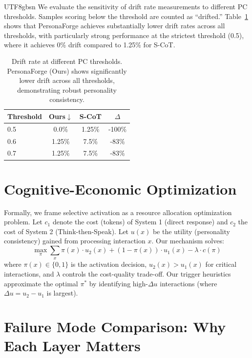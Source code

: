 \documentclass[11pt]{article}
\begin{document}
\begin{CJK*}{UTF8}{gbsn}
We evaluate the sensitivity of drift rate measurements to different PC thresholds. Samples scoring below the threshold are counted as ``drifted.'' Table~\ref{tab:threshold} shows that PersonaForge achieves substantially lower drift rates across all thresholds, with particularly strong performance at the strictest threshold (0.5), where it achieves 0\% drift compared to 1.25\% for S-CoT.

\begin{table}[h]
\centering
\small
\begin{tabular}{lccc}
\toprule
\textbf{Threshold} & \textbf{Ours$\downarrow$} & \textbf{S-CoT} & \textbf{$\Delta$} \\
\midrule
0.5 & 0.0\% & 1.25\% & -100\% \\
0.6 & 1.25\% & 7.5\% & -83\% \\
0.7 & 1.25\% & 7.5\% & -83\% \\
\bottomrule
\end{tabular}
\caption{Drift rate at different PC thresholds. PersonaForge (Ours) shows significantly lower drift across all thresholds, demonstrating robust personality consistency.}
\label{tab:threshold}
\end{table}


\section{Cognitive-Economic Optimization}
\label{sec:cognitive_economic}

Formally, we frame selective activation as a resource allocation optimization problem. Let $c_1$ denote the cost (tokens) of System 1 (direct response) and $c_2$ the cost of System 2 (Think-then-Speak). Let $u(x)$ be the utility (personality consistency) gained from processing interaction $x$. Our mechanism solves:
\begin{equation}
\max_{\pi} \sum_{x} \pi(x) \cdot u_2(x) + (1-\pi(x)) \cdot u_1(x) - \lambda \cdot c(\pi)
\end{equation}
where $\pi(x) \in \{0,1\}$ is the activation decision, $u_2(x) > u_1(x)$ for critical interactions, and $\lambda$ controls the cost-quality trade-off. Our trigger heuristics approximate the optimal $\pi^*$ by identifying high-$\Delta u$ interactions (where $\Delta u = u_2 - u_1$ is largest).

\section{Failure Mode Comparison: Why Each Layer Matters}
\label{sec:failure_mode_comparison}


\end{CJK*}
\end{document}
